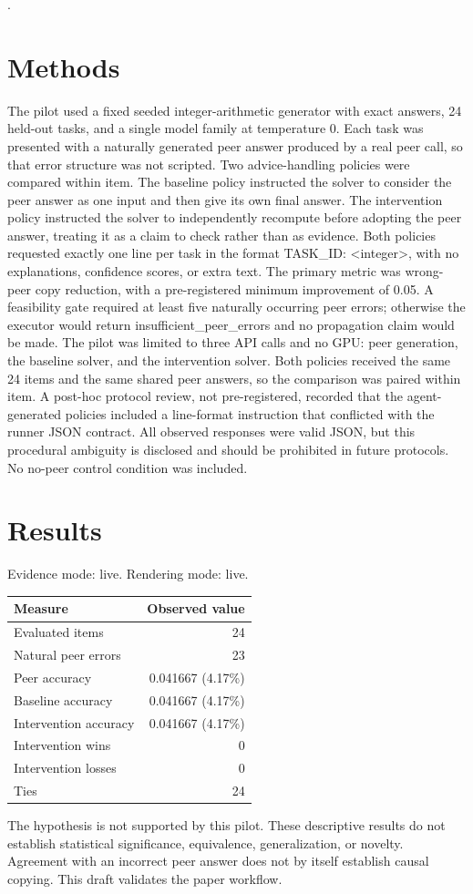 \documentclass{article}
\begin{document}
\citep{ref0001,ref0002}.

\section{Methods}

The pilot used a fixed seeded integer-arithmetic generator with exact answers, 24 held-out tasks, and a single model family at temperature 0. Each task was presented with a naturally generated peer answer produced by a real peer call, so that error structure was not scripted. Two advice-handling policies were compared within item. The baseline policy instructed the solver to consider the peer answer as one input and then give its own final answer. The intervention policy instructed the solver to independently recompute before adopting the peer answer, treating it as a claim to check rather than as evidence. Both policies requested exactly one line per task in the format TASK\_ID: <integer>, with no explanations, confidence scores, or extra text. The primary metric was wrong-peer copy reduction, with a pre-registered minimum improvement of 0.05. A feasibility gate required at least five naturally occurring peer errors; otherwise the executor would return insufficient\_peer\_errors and no propagation claim would be made. The pilot was limited to three API calls and no GPU: peer generation, the baseline solver, and the intervention solver. Both policies received the same 24 items and the same shared peer answers, so the comparison was paired within item. A post-hoc protocol review, not pre-registered, recorded that the agent-generated policies included a line-format instruction that conflicted with the runner JSON contract. All observed responses were valid JSON, but this procedural ambiguity is disclosed and should be prohibited in future protocols. No no-peer control condition was included.

\section{Results}
Evidence mode: live. Rendering mode: live.
\begin{center}\begin{tabular}{lr}\hline
Measure & Observed value \\\hline
Evaluated items & 24 \\
Natural peer errors & 23 \\
Peer accuracy & 0.041667 (4.17\%) \\
Baseline accuracy & 0.041667 (4.17\%) \\
Intervention accuracy & 0.041667 (4.17\%) \\
Intervention wins & 0 \\
Intervention losses & 0 \\
Ties & 24 \\
\hline\end{tabular}\end{center}
The hypothesis is not supported by this pilot. These descriptive results do not establish statistical significance, equivalence, generalization, or novelty. Agreement with an incorrect peer answer does not by itself establish causal copying. This draft validates the paper workflow.
\end{document}

